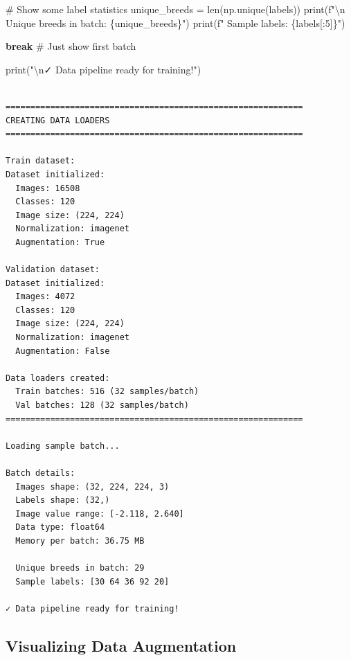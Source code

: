 \documentclass[
  letterpaper,
  DIV=11,
  numbers=noendperiod]{scrartcl}
\newenvironment{Shaded}{\begin{snugshade}}{\end{snugshade}}
\newcommand{\BuiltInTok}[1]{\textcolor[rgb]{0.00,0.23,0.31}{#1}}
\newcommand{\CharTok}[1]{\textcolor[rgb]{0.13,0.47,0.30}{#1}}
\newcommand{\CommentTok}[1]{\textcolor[rgb]{0.37,0.37,0.37}{#1}}
\newcommand{\ControlFlowTok}[1]{\textcolor[rgb]{0.00,0.23,0.31}{\textbf{#1}}}
\newcommand{\DecValTok}[1]{\textcolor[rgb]{0.68,0.00,0.00}{#1}}
\newcommand{\NormalTok}[1]{\textcolor[rgb]{0.00,0.23,0.31}{#1}}
\newcommand{\OperatorTok}[1]{\textcolor[rgb]{0.37,0.37,0.37}{#1}}
\newcommand{\SpecialCharTok}[1]{\textcolor[rgb]{0.37,0.37,0.37}{#1}}
\newcommand{\SpecialStringTok}[1]{\textcolor[rgb]{0.13,0.47,0.30}{#1}}
\newcommand{\StringTok}[1]{\textcolor[rgb]{0.13,0.47,0.30}{#1}}
\renewenvironment{Shaded}{%
  \begin{tcolorbox}[%
    enhanced,%
    colback=codebg,%
    colframe=codebg,%
    borderline west={3pt}{0pt}{sectionblue},%
    boxrule=0pt,%
    arc=0pt,%
    boxsep=5pt,%
    left=2mm,%
    right=2mm,%
    top=2mm,%
    bottom=2mm%
  ]%
}{%
  \end{tcolorbox}%
}
\begin{document}
\begin{Shaded}
\begin{Highlighting}[]
    \CommentTok{\# Show some label statistics}
\NormalTok{    unique\_breeds }\OperatorTok{=} \BuiltInTok{len}\NormalTok{(np.unique(labels))}
    \BuiltInTok{print}\NormalTok{(}\SpecialStringTok{f"}\CharTok{\textbackslash{}n}\SpecialStringTok{  Unique breeds in batch: }\SpecialCharTok{\{}\NormalTok{unique\_breeds}\SpecialCharTok{\}}\SpecialStringTok{"}\NormalTok{)}
    \BuiltInTok{print}\NormalTok{(}\SpecialStringTok{f"  Sample labels: }\SpecialCharTok{\{}\NormalTok{labels[:}\DecValTok{5}\NormalTok{]}\SpecialCharTok{\}}\SpecialStringTok{"}\NormalTok{)}
    
    \ControlFlowTok{break}  \CommentTok{\# Just show first batch}

\BuiltInTok{print}\NormalTok{(}\StringTok{"}\CharTok{\textbackslash{}n}\StringTok{✓ Data pipeline ready for training!"}\NormalTok{)}
\end{Highlighting}
\end{Shaded}

\begin{verbatim}

============================================================
CREATING DATA LOADERS
============================================================

Train dataset:
Dataset initialized:
  Images: 16508
  Classes: 120
  Image size: (224, 224)
  Normalization: imagenet
  Augmentation: True

Validation dataset:
Dataset initialized:
  Images: 4072
  Classes: 120
  Image size: (224, 224)
  Normalization: imagenet
  Augmentation: False

Data loaders created:
  Train batches: 516 (32 samples/batch)
  Val batches: 128 (32 samples/batch)
============================================================

Loading sample batch...

Batch details:
  Images shape: (32, 224, 224, 3)
  Labels shape: (32,)
  Image value range: [-2.118, 2.640]
  Data type: float64
  Memory per batch: 36.75 MB

  Unique breeds in batch: 29
  Sample labels: [30 64 36 92 20]

✓ Data pipeline ready for training!
\end{verbatim}

\subsection{Visualizing Data
Augmentation}\label{visualizing-data-augmentation}
\end{document}
